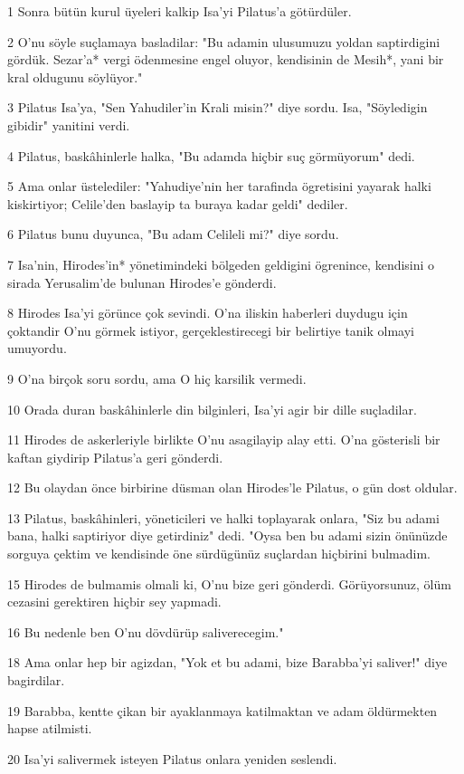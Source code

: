 \par 1 Sonra bütün kurul üyeleri kalkip Isa'yi Pilatus'a götürdüler.
\par 2 O'nu söyle suçlamaya basladilar: "Bu adamin ulusumuzu yoldan saptirdigini gördük. Sezar'a* vergi ödenmesine engel oluyor, kendisinin de Mesih*, yani bir kral oldugunu söylüyor."
\par 3 Pilatus Isa'ya, "Sen Yahudiler'in Krali misin?" diye sordu. Isa, "Söyledigin gibidir" yanitini verdi.
\par 4 Pilatus, baskâhinlerle halka, "Bu adamda hiçbir suç görmüyorum" dedi.
\par 5 Ama onlar üstelediler: "Yahudiye'nin her tarafinda ögretisini yayarak halki kiskirtiyor; Celile'den baslayip ta buraya kadar geldi" dediler.
\par 6 Pilatus bunu duyunca, "Bu adam Celileli mi?" diye sordu.
\par 7 Isa'nin, Hirodes'in* yönetimindeki bölgeden geldigini ögrenince, kendisini o sirada Yerusalim'de bulunan Hirodes'e gönderdi.
\par 8 Hirodes Isa'yi görünce çok sevindi. O'na iliskin haberleri duydugu için çoktandir O'nu görmek istiyor, gerçeklestirecegi bir belirtiye tanik olmayi umuyordu.
\par 9 O'na birçok soru sordu, ama O hiç karsilik vermedi.
\par 10 Orada duran baskâhinlerle din bilginleri, Isa'yi agir bir dille suçladilar.
\par 11 Hirodes de askerleriyle birlikte O'nu asagilayip alay etti. O'na gösterisli bir kaftan giydirip Pilatus'a geri gönderdi.
\par 12 Bu olaydan önce birbirine düsman olan Hirodes'le Pilatus, o gün dost oldular.
\par 13 Pilatus, baskâhinleri, yöneticileri ve halki toplayarak onlara, "Siz bu adami bana, halki saptiriyor diye getirdiniz" dedi. "Oysa ben bu adami sizin önünüzde sorguya çektim ve kendisinde öne sürdügünüz suçlardan hiçbirini bulmadim.
\par 15 Hirodes de bulmamis olmali ki, O'nu bize geri gönderdi. Görüyorsunuz, ölüm cezasini gerektiren hiçbir sey yapmadi.
\par 16 Bu nedenle ben O'nu dövdürüp saliverecegim."
\par 18 Ama onlar hep bir agizdan, "Yok et bu adami, bize Barabba'yi saliver!" diye bagirdilar.
\par 19 Barabba, kentte çikan bir ayaklanmaya katilmaktan ve adam öldürmekten hapse atilmisti.
\par 20 Isa'yi salivermek isteyen Pilatus onlara yeniden seslendi.
